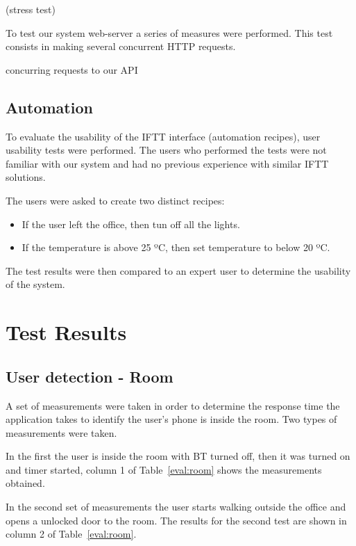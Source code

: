 (stress test)

To test our system web-server a series of measures were performed. This test consists in making several concurrent \ac{HTTP} requests.

 concurring requests to our \ac{API} 


\subsection{Automation}

To evaluate the usability of the \ac{IFTT} interface (automation recipes), user usability tests were performed. The users who performed the tests were not familiar with our system and had no previous experience with similar \ac{IFTT} solutions.

The users were asked to create two distinct recipes:

\begin{itemize}
  \item If the user left the office, then tun off all the lights.
  \item If the temperature is above 25 ºC, then set temperature to below 20 ºC. 
\end{itemize} 

The test results were then compared to an expert user to determine the usability of the system.



\section{Test Results}


\subsection{User detection - Room}

A set of measurements were taken in order to determine the response time the application takes to identify the user's phone is inside the room. Two types of measurements were taken.

In the first the user is inside the room with \ac{BT} turned off, then it was turned on and timer started, column 1 of Table~\ref{eval:room} shows the measurements obtained. 

In the second set of measurements the user starts walking outside the office and opens a unlocked door to the room. The results for the second test are shown in column 2 of Table~\ref{eval:room}.

